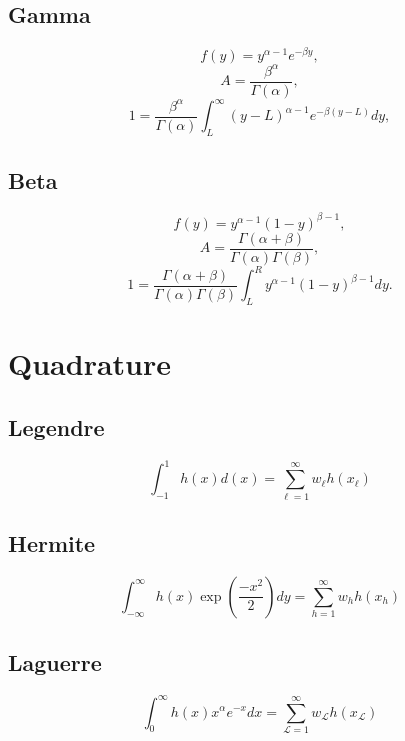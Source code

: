 \documentclass[11pt]{article}
\begin{document}
\subsection{Gamma}
\begin{equation}
f(y) = y^{\alpha-1}e^{-\beta y},
\end{equation}
\begin{equation}
A = \frac{\beta^\alpha}{\Gamma(\alpha)},
\end{equation}
\begin{equation}
1 = \frac{\beta^\alpha}{\Gamma(\alpha)}\int_L^\infty (y-L)^{\alpha-1}e^{-\beta (y-L)} dy,
\end{equation}

\subsection{Beta}
\begin{equation}
f(y) = y^{\alpha-1}(1-y)^{\beta-1},
\end{equation}
\begin{equation}
A =\frac{ \Gamma(\alpha+\beta)}{\Gamma(\alpha)\Gamma(\beta)},
\end{equation}
\begin{equation}
1 = \frac{ \Gamma(\alpha+\beta)}{\Gamma(\alpha)\Gamma(\beta)}\int_L^R y^{\alpha-1}(1-y)^{\beta-1} dy.
\end{equation}

\section{Quadrature}
\subsection{Legendre}
\begin{equation}
 \int_{-1}^1 h(x)d(x) = \sum_{\ell=1}^\infty w_\ell h(x_\ell)
\end{equation}

\subsection{Hermite}
\begin{equation}
\int_{-\infty}^\infty h(x)\exp(\frac{-x^2}{2})dy = \sum_{h=1}^\infty w_h h(x_h)
\end{equation}

\subsection{Laguerre}
\begin{equation}
\int_0^\infty h(x) x^\alpha e^{-x} dx = \sum_{\mathcal{L}=1}^\infty w_\mathcal{L} h(x_\mathcal{L})
\end{equation}
\end{document}
